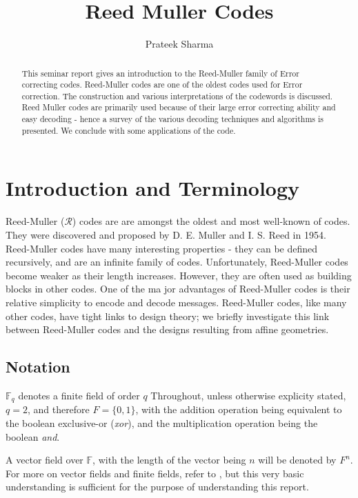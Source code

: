 \documentclass{article}
\title{Reed Muller Codes}
\author{Prateek Sharma}
\newcommand{\F}{\ensuremath{\mathbb{F}}}
\begin{document}
\maketitle

\begin{abstract} 
This seminar report gives an introduction to the Reed-Muller family of Error correcting codes. Reed-Muller codes are one of the oldest codes used for Error correction. The construction and various interpretations of the codewords is discussed. Reed Muller codes are primarily used because of their large error correcting ability and easy decoding - hence a survey of the various decoding techniques and algorithms is presented. We conclude with some applications of the code.
\end{abstract}


\section {Introduction and Terminology}

Reed-Muller ($\mathcal{R}$) codes are are amongst the oldest and most well-known of codes. They were discovered and proposed by D. E. Muller and I. S. Reed in 1954. \cite{original}
Reed-Muller codes have many interesting properties - they can be deﬁned recursively, and are an infinite family of codes. 
Unfortunately, Reed-Muller codes become weaker as their length increases. However, they are often used as building blocks in other codes. 
One of the ma jor advantages of Reed-Muller codes is their relative simplicity to encode and decode messages.
Reed-Muller codes, like many other codes, have tight links to design theory; we brieﬂy investigate this link between Reed-Muller codes and the designs resulting from affine geometries. 

\subsection{Notation}
$\F _q$ denotes a finite field of order $q$
Throughout, unless otherwise explicity stated, $q=2$, and therefore $F=\{0,1\}$, with the addition operation being equivalent to the boolean exclusive-or (\emph{xor}), and the multiplication operation being the boolean \emph{and}.

A vector field over $\F$, with the length of the vector being $n$ will be denoted by $F^n$. For more on vector fields and finite fields, refer to \cite{vectors}, but this very basic understanding is sufficient for the purpose of understanding this report.
\end{document}
